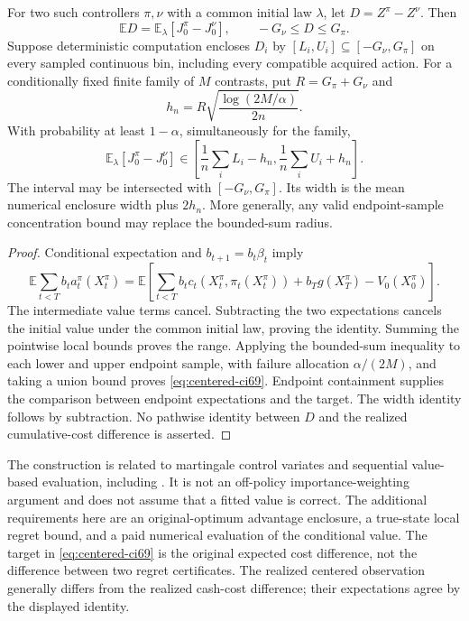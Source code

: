 \begin{theorem}\label{thm:centered69}
For two such controllers $\pi,\nu$ with a common initial law $\lambda$, let $D=Z^\pi-Z^\nu$. Then
\begin{equation}\label{eq:centered-identity69}
 \mathbb E D=\mathbb E_\lambda[J_0^\pi-J_0^\nu],
 \qquad -G_\nu\le D\le G_\pi.
\end{equation}
Suppose deterministic computation encloses $D_i$ by $[L_i,U_i]\subseteq[-G_\nu,G_\pi]$ on every sampled continuous bin, including every compatible acquired action. For a conditionally fixed finite family of $M$ contrasts, put $R=G_\pi+G_\nu$ and
\[
 h_n=R\sqrt{\frac{\log(2M/\alpha)}{2n}}.
\]
With probability at least $1-\alpha$, simultaneously for the family,
\begin{equation}\label{eq:centered-ci69}
 \mathbb E_\lambda[J_0^\pi-J_0^\nu]
 \in\left[\frac1n\sum_iL_i-h_n,\frac1n\sum_iU_i+h_n\right].
\end{equation}
The interval may be intersected with $[-G_\nu,G_\pi]$. Its width is the mean numerical enclosure width plus $2h_n$. More generally, any valid endpoint-sample concentration bound may replace the bounded-sum radius.
\end{theorem}
\begin{proof}
Conditional expectation and $b_{t+1}=b_t\beta_t$ imply
\[
 \mathbb E\sum_{t<T}b_t a_t^\pi(X_t^\pi)
 =\mathbb E\left[\sum_{t<T}b_tc_t(X_t^\pi,\pi_t(X_t^\pi))
                  +b_Tg(X_T^\pi)-V_0(X_0^\pi)\right].
\]
The intermediate value terms cancel. Subtracting the two expectations cancels the initial value under the common initial law, proving the identity. Summing the pointwise local bounds proves the range. Applying the bounded-sum inequality to each lower and upper endpoint sample, with failure allocation $\alpha/(2M)$, and taking a union bound proves \eqref{eq:centered-ci69}. Endpoint containment supplies the comparison between endpoint expectations and the target. The width identity follows by subtraction. No pathwise identity between $D$ and the realized cumulative-cost difference is asserted.
\end{proof}

The construction is related to martingale control variates and sequential value-based evaluation, including \citet{jiang2016}. It is not an off-policy importance-weighting argument and does not assume that a fitted value is correct. The additional requirements here are an original-optimum advantage enclosure, a true-state local regret bound, and a paid numerical evaluation of the conditional value. The target in \eqref{eq:centered-ci69} is the original expected cost difference, not the difference between two regret certificates. The realized centered observation generally differs from the realized cash-cost difference; their expectations agree by the displayed identity.

